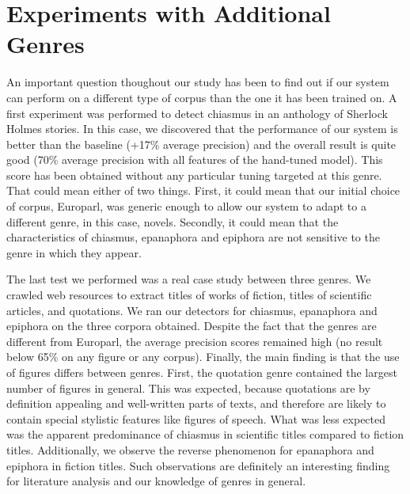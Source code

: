 \section{Experiments with Additional Genres}

An important question thoughout our study has been to find out if our system can perform on a different type of corpus than the one it has been trained on. A first experiment was performed to detect chiasmus in an anthology of Sherlock Holmes stories. In this case, we discovered that the performance of our system is better than the baseline (+17\% average precision) and the overall result is quite good (70\% average precision with all features of the hand-tuned model). This score has been obtained without any particular tuning targeted at this genre. That could mean either of two things. First, it could mean that our initial choice of corpus, Europarl, was generic enough to allow our system to adapt to a different genre, in this case, novels. Secondly, it could mean that the characteristics of chiasmus, epanaphora and epiphora are not sensitive to the genre in which they appear.

The last test we performed was a real case study between three genres. We crawled web resources to extract titles of works of fiction, titles of scientific articles, and quotations. We ran our detectors for chiasmus, epanaphora and epiphora on the three corpora obtained. Despite the fact that the genres are different from Europarl, the average precision scores remained high (no result below 65\% on any figure or any corpus). Finally, the main finding is that the use of figures differs between genres. First, the quotation genre contained the largest number of figures in general. This was expected, because quotations are by definition appealing and well-written parts of texts, and therefore are likely to contain special stylistic features like figures of speech. What was less expected was the apparent predominance of chiasmus in scientific titles compared to fiction titles. Additionally, we observe the reverse phenomenon for epanaphora and epiphora in fiction titles. Such observations are definitely an interesting finding for literature analysis and our knowledge of genres in general.

